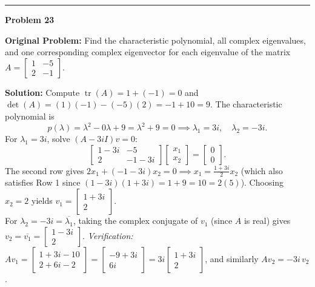 \documentclass[11pt, letterpaper]{article}
\theoremstyle{definition}
\theoremstyle{remark}
\begin{document}
\noindent\rule{\textwidth}{0.4pt}

\noindent\textbf{Problem 23}

\textbf{Original Problem:} Find the characteristic polynomial, all complex eigenvalues, and one corresponding complex eigenvector for each eigenvalue of the matrix $A = \begin{bmatrix} 1 & -5 \\ 2 & -1 \end{bmatrix}$.

\textbf{Solution:} Compute $\operatorname{tr}(A) = 1 + (-1) = 0$ and $\det(A) = (1)(-1) - (-5)(2) = -1 + 10 = 9$. The characteristic polynomial is
\[
p(\lambda) = \lambda^2 - 0\lambda + 9 = \lambda^2 + 9 = 0 \implies \lambda_1 = 3i, \quad \lambda_2 = -3i.
\]
For $\lambda_1 = 3i$, solve $(A - 3iI)v = 0$:
\[
\begin{bmatrix} 1 - 3i & -5 \\ 2 & -1 - 3i \end{bmatrix}\begin{bmatrix} x_1 \\ x_2 \end{bmatrix} = \begin{bmatrix} 0 \\ 0 \end{bmatrix}.
\]
The second row gives $2x_1 + (-1 - 3i)x_2 = 0 \implies x_1 = \frac{1 + 3i}{2}x_2$ (which also satisfies Row 1 since $(1 - 3i)(1 + 3i) = 1 + 9 = 10 = 2(5)$). Choosing $x_2 = 2$ yields $v_1 = \begin{bmatrix} 1 + 3i \\ 2 \end{bmatrix}$. \\
For $\lambda_2 = -3i = \overline{\lambda_1}$, taking the complex conjugate of $v_1$ (since $A$ is real) gives $v_2 = \overline{v_1} = \begin{bmatrix} 1 - 3i \\ 2 \end{bmatrix}$.
\textit{Verification:} $Av_1 = \begin{bmatrix} 1 + 3i - 10 \\ 2 + 6i - 2 \end{bmatrix} = \begin{bmatrix} -9 + 3i \\ 6i \end{bmatrix} = 3i\begin{bmatrix} 1 + 3i \\ 2 \end{bmatrix}$, and similarly $Av_2 = -3i\,v_2$.
\end{document}
